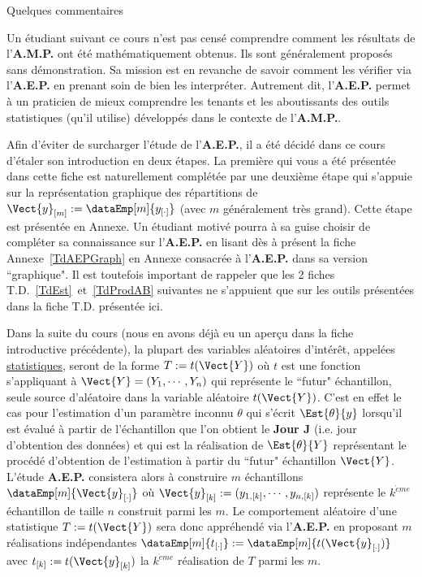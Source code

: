 \documentclass[10pt]{report}
\begin{document}
\begin{IndicList}{Quelques commentaires} 
\item Un étudiant suivant ce cours n'est pas censé comprendre comment les résultats de l'\textbf{A.M.P.} ont été mathématiquement obtenus. Ils sont généralement proposés sans démonstration.
Sa mission est en revanche de savoir comment les vérifier via l'\textbf{A.E.P.} en prenant soin de bien les interpréter. Autrement dit, l'\textbf{A.E.P.} permet à un praticien de mieux comprendre les tenants et les aboutissants des outils statistiques (qu'il utilise) développés dans le contexte de l'\textbf{A.M.P.}.
\item Afin d'éviter de surcharger l'étude de l'\textbf{A.E.P.}, il a été décidé dans ce cours d'étaler son introduction en deux étapes. La première qui vous a été présentée dans cette fiche est naturellement complétée par une deuxième étape qui s'appuie sur la représentation graphique des répartitions de $\Vect{y}_{[m]}:=\dataEmp[m]{y_{[\cdot]}}$ (avec $m$ généralement très grand).
Cette étape est présentée en Annexe. Un étudiant motivé pourra à sa guise choisir de compléter sa connaissance sur l'\textbf{A.E.P.} en lisant dès à présent la fiche Annexe~\ref{TdAEPGraph} en Annexe consacrée à l'\textbf{A.E.P.} dans sa version ``graphique". Il est toutefois important de rappeler que les 2 fiches T.D.~\ref{TdEst}~et~\ref{TdProdAB} suivantes ne s'appuient que sur les outils présentées dans la fiche T.D. présentée ici.      
\item Dans la suite du cours (nous en avons déjà eu un aperçu dans la fiche introductive précédente), la plupart des variables aléatoires d'intérêt, appelées \underline{statistiques}, seront de la forme $T:=t(\Vect{Y})$ où $t$ est une fonction s'appliquant à $\Vect{Y}=(Y_1,\cdots,Y_n)$ qui représente le ``futur" échantillon, seule source d'aléatoire dans la variable aléatoire $t(\Vect{Y})$. C'est en effet le cas pour  l'estimation d'un paramètre inconnu $\theta$ qui s'écrit $\Est{\theta}{y}$ lorsqu'il est évalué à partir de l'échantillon que l'on obtient le \textbf{Jour J} (i.e. jour d'obtention des données) et qui est la réalisation de $\Est{\theta}{Y}$ représentant le procédé d'obtention de l'estimation à partir du ``futur" échantillon $\Vect{Y}$. L'étude \textbf{A.E.P.} consistera alors à construire $m$ échantillons $\dataEmp[m]{\Vect{y}_{[\cdot]}}$ où $\Vect{y}_{[k]}:=(y_{1,[k]},\cdots,y_{n,[k]})$ représente le $k^{\grave eme}$ échantillon de taille $n$ construit parmi les $m$. Le comportement aléatoire d'une statistique $T:=t(\Vect{Y})$ sera donc appréhendé via  l'\textbf{A.E.P.} en proposant $m$ réalisations indépendantes $\dataEmp[m]{t_{[\cdot]}}:=\dataEmp[m]{t(\Vect{y}_{[\cdot]})}$ avec $t_{[k]}:=t(\Vect{y}_{[k]})$ la $k^{\grave eme}$ réalisation de $T$ parmi les $m$.
\end{IndicList}
\end{document}
